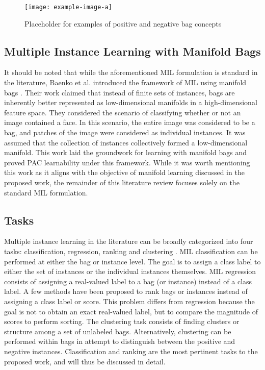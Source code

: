\begin{center}
	\begin{figure*}[h]
		\centering
		\texttt{[image: example-image-a]}
		\caption[Multiple instance learning bags.]{Placeholder for examples of positive and negative bag concepts}
		\label{fig:bag_eg}
	\end{figure*}
\end{center}

\noindent

\subsection{Multiple Instance Learning with Manifold Bags}
It should be noted that while the aforementioned MIL formulation is standard in the literature, Baenko et al. introduced the framework of MIL using manifold bags  \citep{Babenko2011MILManifoldBags}.  Their work claimed that instead of finite sets of instances, bags are inherently better represented as low-dimensional manifolds in a high-dimensional feature space.  They considered the scenario of classifying whether or not an image contained a face.  In this scenario, the entire image was considered to be a bag, and patches of the image were considered as individual instances.  It was assumed that the collection of instances collectively formed a low-dimensional manifold.  This work laid the groundwork for learning with manifold bags and proved PAC learnability under this framework.  While it was worth mentioning this work as it aligns with the objective of manifold learning discussed in the proposed work, the remainder of this literature review focuses solely on the standard MIL formulation.

\subsection{Tasks}
Multiple instance learning in the literature can be broadly categorized into four tasks: classification, regression, ranking and clustering \citep{Carbonneau2016MILSurvey}.  MIL classification can be performed at either the bag or instance level.  The goal is to assign a class label to either the set of instances or the individual instances themselves.  MIL regression consists of assigning a real-valued label to a bag (or instance) instead of a class label.  A few methods have been proposed to rank bags or instances instead of assigning a class label or score.  This problem differs from regression because the goal is not to obtain an exact real-valued label, but to compare the magnitude of scores to perform sorting.  The clustering task consists of finding clusters or structure among a set of unlabeled bags.  Alternatively, clustering can be performed within bags in attempt to distinguish between the positive and negative instances.  Classification and ranking are the most pertinent tasks to the proposed work, and will thus be discussed in detail.

